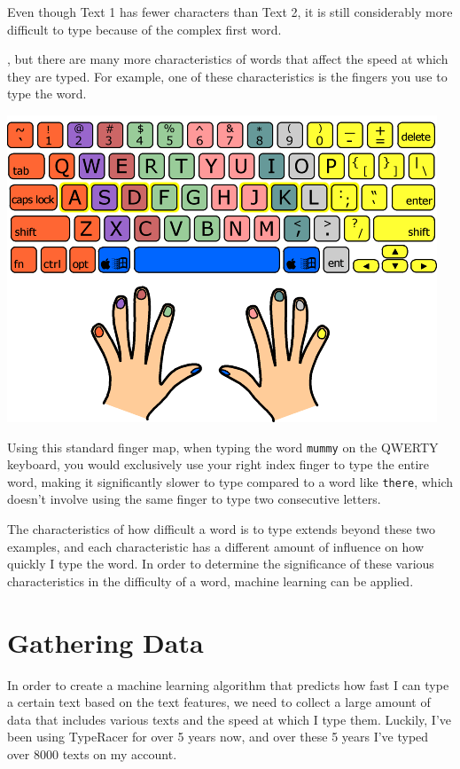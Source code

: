 \documentclass[12pt, demo]{article}
\newenvironment{textexamples}
  {\medskip\par\setlength{\parindent}{0pt}}
  {\par\medskip}
\begin{document}
Even though Text 1 has fewer characters than Text 2, it is still considerably more difficult to type because of the complex first word.

, but there are many more characteristics of words that affect the speed at which they are typed. For example, one of these characteristics is the fingers you use to type the word.

\includegraphics{finger-map.png}

Using this standard finger map, when typing the word \texttt{mummy} on the QWERTY keyboard, you would exclusively use your right index finger to type the entire word, making it significantly slower to type compared to a word like \texttt{there}, which doesn't involve using the same finger to type two consecutive letters.

\begin{textexamples}
\end{textexamples}

The characteristics of how difficult a word is to type extends beyond these two examples, and each characteristic has a different amount of influence on how quickly I type the word. In order to determine the significance of these various characteristics in the difficulty of a word, machine learning can be applied.

\section*{Gathering Data}

In order to create a machine learning algorithm that predicts how fast I can type a certain text based on the text features, we need to collect a large amount of data that includes various texts and the speed at which I type them. Luckily, I've been using TypeRacer for over 5 years now, and over these 5 years I've typed over 8000 texts on my account.
\end{document}
